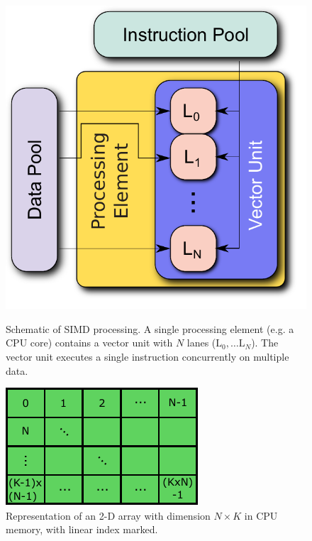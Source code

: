 \documentclass[12pt]{ussci}
\begin{document}
\begin{figure}[htb]
  \centering
  \begin{minipage}[t]{0.45\linewidth}
      \includegraphics[width=\textwidth]{SIMD.pdf}
      \caption{Schematic of SIMD processing.  A single processing element (e.g. a CPU core) contains a vector unit with $N$ lanes ($\text{L}_0,\ldots \text{L}_N$).  The vector unit executes a single instruction concurrently on multiple data.}
      \label{F:SIMD}
  \end{minipage}
  \hfill
  \begin{minipage}[t]{0.45\linewidth}
      \includegraphics[width=\textwidth]{mem_access.pdf}
      \caption{Representation of an 2-D array with dimension $N \times K$ in CPU memory, with linear index marked.}
      \label{F:mem}
  \end{minipage}
\end{figure}
\end{document}
